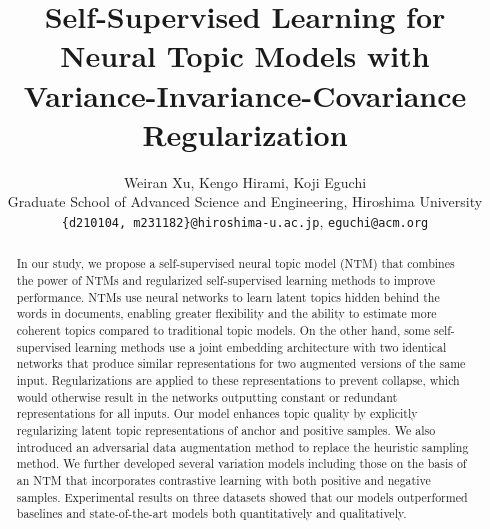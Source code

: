 \documentclass{article}
\title{Self-Supervised Learning for Neural Topic Models with Variance-Invariance-Covariance Regularization}
\author{
    Weiran Xu, Kengo Hirami, Koji Eguchi \\
    Graduate School of Advanced Science and Engineering, Hiroshima University \\
    \texttt{\{d210104, m231182\}@hiroshima-u.ac.jp}, \texttt{eguchi@acm.org}
}
\date{}
\begin{document}
\maketitle
\begin{abstract}
    In our study, we propose a self-supervised neural topic model (NTM) that combines the power of NTMs and regularized self-supervised learning methods to improve performance. 
    NTMs use neural networks to learn latent topics hidden behind the words in documents, enabling greater flexibility and the ability to estimate more coherent topics compared to traditional topic models. 
    On the other hand, some self-supervised learning methods use a joint embedding architecture with two identical networks that produce similar representations for two augmented versions of the same input. 
    Regularizations are applied to these representations to prevent collapse, which would otherwise result in the networks outputting constant or redundant representations for all inputs.
    Our model enhances topic quality by explicitly regularizing latent topic representations of anchor and positive samples. 
    We also introduced an adversarial data augmentation method to replace the heuristic sampling method. 
    We further developed several variation models including those on the basis of an NTM that incorporates contrastive learning with both positive and negative samples. 
    Experimental results on three datasets showed that our models outperformed baselines and state-of-the-art models both quantitatively and qualitatively.
\end{abstract}
\end{document}
